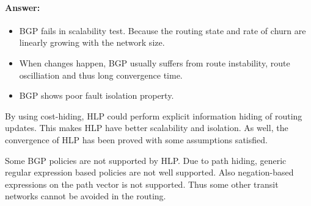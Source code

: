 \documentclass[a4paper,11pt]{article}
\theoremstyle{mytheor}
\begin{document}
\begin{enumerate}
\paragraph{Answer:}
\begin{itemize}
\item BGP fails in scalability test. 
Because the routing state and rate of churn are linearly growing with the network size.
\item When changes happen, BGP usually suffers from route instability, route oscilliation and thus long convergence time.
\item BGP shows poor fault isolation property.
\end{itemize}
By using cost-hiding, HLP could perform explicit information hiding of routing updates.
This makes HLP have better scalability and isolation.
As well, the convergence of HLP has been proved with some assumptions satisfied.

Some BGP policies are not supported by HLP.
Due to path hiding, generic regular expression based policies are not well supported.
Also negation-based expressions on the path vector is not supported. 
Thus some other transit networks cannot be avoided in the routing.

\end{enumerate}
\end{document}
